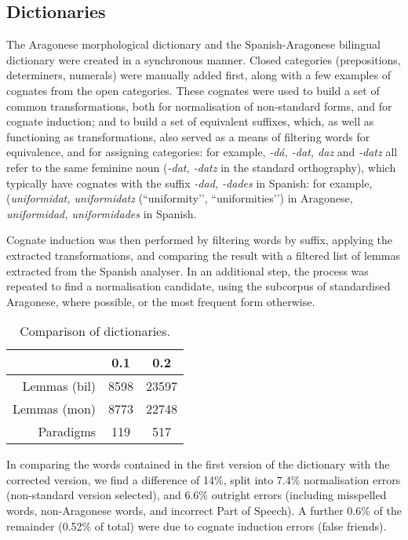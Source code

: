 \documentclass[10pt, a4paper]{article}
\begin{document}
  \subsection{Dictionaries}
  
  The Aragonese morphological dictionary and the Spanish-Aragonese bilingual dictionary were created in a synchronous manner. Closed categories (prepositions, determiners, numerals) were manually added first, along with a few examples of cognates from the open categories. These cognates were used to build a set of common transformations, both for normalisation of non-standard forms, and for cognate induction; and to build a set of equivalent suffixes, which, as well as functioning as transformations, also served as a means of filtering words for equivalence, and for assigning categories: for example, {\em -dá,  -dat, daz} and {\em -datz} all refer to the same feminine noun ({\em -dat, -datz} in the standard orthography), which typically have cognates with the suffix {\em -dad, -dades} in Spanish: for example, ({\em uniformidat, uniformidatz} (``uniformity’’, ``uniformities’’) in Aragonese, {\em uniformidad, uniformidades} in Spanish.

  Cognate induction was then performed by filtering words by suffix, applying the extracted transformations, and comparing the result with a filtered list of lemmas extracted from the Spanish analyser. In an additional step, the process was repeated to find a normalisation candidate, using the subcorpus of standardised Aragonese, where possible, or the most frequent form otherwise.
  
  \begin{table}
  \begin{center}
  \caption{Comparison of dictionaries.\label{tab:phases}}
  \begin{tabular}{|r|c|c|}
  \hline
    & 0.1 & 0.2 \\
  \hline
  Lemmas (bil) & 8598  & 23597 \\
  \hline
  Lemmas (mon) & 8773  & 22748\\
  Paradigms    & 119   & 517  \\
  \hline
  \end{tabular}
  \end{center}
  \end{table}
  
  In comparing the words contained in the first version of the dictionary with the corrected version, we find a difference of 14\%, split into 7.4\% normalisation errors (non-standard version selected), and 6.6\% outright errors (including misspelled words, non-Aragonese words, and incorrect Part of Speech). A further 0.6\% of the remainder (0.52\% of total) were due to cognate induction errors (false friends).
  
\end{document}
